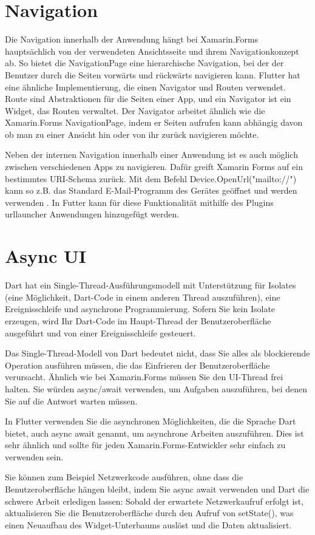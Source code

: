 \section{Navigation}
Die Navigation innerhalb der Anwendung hängt bei Xamarin.Forms hauptsächlich von der verwendeten Ansichtsseite und ihrem Navigationkonzept ab.  So bietet die NavigationPage eine hierarchische Navigation, bei der der Benutzer durch die Seiten vorwärts und rückwärts navigieren kann. Flutter hat eine ähnliche Implementierung,  die einen Navigator und Routen verwendet.  Route sind  Abstraktionen für die Seiten einer App, und ein Navigator ist ein Widget, das Routen verwaltet.  Der Navigator arbeitet ähnlich wie die Xamarin.Forms NavigationPage, indem er Seiten aufrufen kann abhängig davon ob man zu einer Ansicht hin oder von ihr zurück navigieren möchte.

Neben der internen Navigation innerhalb einer Anwendung ist es auch möglich zwischen verschiedenen Apps zu navigieren.  Dafür greift Xamarin Forms auf ein bestimmtes URI-Schema zurück.  Mit dem Befehl Device.OpenUrl("mailto://") kann so z.B. das  Standard E-Mail-Programm des Gerätes geöffnet und werden verwenden . In Futter kann für diese Funktionalität mithilfe des Plugins urllauncher Anwendungen hinzugefügt werden.

\section{Async UI}
Dart hat ein Single-Thread-Ausführungsmodell mit Unterstützung für Isolates (eine Möglichkeit, Dart-Code in einem anderen Thread auszuführen), eine Ereignisschleife und asynchrone Programmierung.  Sofern Sie kein Isolate erzeugen, wird Ihr Dart-Code im Haupt-Thread der Benutzeroberfläche ausgeführt und von einer Ereignisschleife gesteuert.

Das Single-Thread-Modell von Dart bedeutet nicht, dass Sie alles als blockierende Operation ausführen müssen, die das Einfrieren der Benutzeroberfläche verursacht. Ähnlich wie bei Xamarin.Forms müssen Sie den UI-Thread frei halten. Sie würden async/await verwenden, um Aufgaben auszuführen, bei denen Sie auf die Antwort warten müssen.

In Flutter verwenden Sie die asynchronen Möglichkeiten, die die Sprache Dart bietet, auch async await genannt, um asynchrone Arbeiten auszuführen. Dies ist \Csharp sehr ähnlich und sollte für jeden Xamarin.Forms-Entwickler sehr einfach zu verwenden sein.

Sie können zum Beispiel Netzwerkcode ausführen, ohne dass die Benutzeroberfläche hängen bleibt, indem Sie async await verwenden und Dart die schwere Arbeit erledigen lassen:
Sobald der erwartete Netzwerkaufruf erfolgt ist, aktualisieren Sie die Benutzeroberfläche durch den Aufruf von setState(), was einen Neuaufbau des Widget-Unterbaums auslöst und die Daten aktualisiert.
